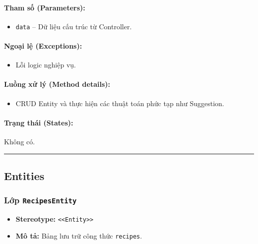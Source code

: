 \documentclass[12pt,a4paper]{article}
\begin{document}
\paragraph{Tham số (Parameters):}
\begin{itemize}[leftmargin=*]
    \item \texttt{data} – Dữ liệu cấu trúc từ Controller.
\end{itemize}


\paragraph{Ngoại lệ (Exceptions):}
\begin{itemize}[leftmargin=*]
    \item Lỗi logic nghiệp vụ.
\end{itemize}


\paragraph{Luồng xử lý (Method details):}
\begin{itemize}[leftmargin=*]
    \item CRUD Entity và thực hiện các thuật toán phức tạp như Suggestion.
\end{itemize}


\paragraph{Trạng thái (States):}
Không có.

\vskip 0.5cm
\noindent\rule{\textwidth}{0.5pt}
\vskip 0.5cm

\subsection{Entities}

\subsubsection{Lớp \texttt{RecipesEntity}}
\begin{itemize}[leftmargin=*]
    \item \textbf{Stereotype:} \texttt{\textless{}\textless{}Entity\textgreater{}\textgreater{}}
    \item \textbf{Mô tả:} Bảng lưu trữ công thức \texttt{recipes}.
\end{itemize}
\end{document}
